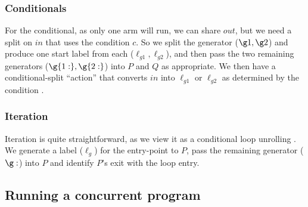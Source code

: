 \subsubsection{Conditionals}

For the conditional, as only one arm will run, we can share $out$,
but we need a split on $in$ that uses the condition $c$.
So we split the generator ($\g1,\g2$) and produce one start label from each
($\ell_{g1},\ell_{g2}$), and then pass the two remaining generators
($\g{1:},\g{2:}$)
into $P$ and $Q$ as appropriate.
We then have a conditional-split ``action'' that
converts $in$ into $\ell_{g1}$ or $\ell_{g2}$ as determined by the condition%
.

\subsubsection{Iteration}


Iteration is quite straightforward,
as we view it as a conditional loop unrolling%
.
We generate a label ($\ell_g$) for the entry-point to $P$,
pass the remaining generator ($\g:$) into $P$
and identify $P$'s exit with the loop entry.

\subsection{Running a concurrent program}

